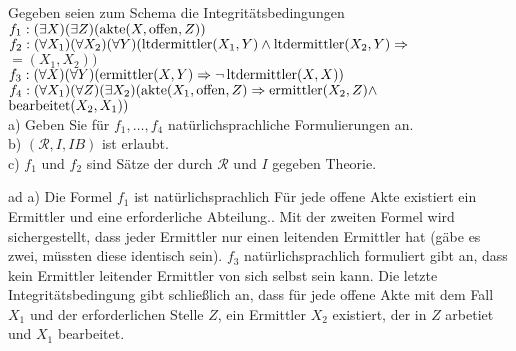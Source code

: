 \documentclass[12pt,a4paper]{amsart}
\begin{document}
\bigskip

\begin{aufgabe1}
Gegeben seien zum Schema die Integritätsbedingungen\\
$f_1:(\exists X)(\exists Z)(\operatorname{akte}(X,\operatorname{offen},Z))$\\
$f_2:(\forall X_1)(\forall X_2)(\forall Y)(\operatorname{ltdermittler}(X_1,Y)\land\operatorname{ltdermittler}(X_2,Y)\Rightarrow$\\ $=(X_1,X_2))$\\
$f_3:(\forall X)(\forall Y)(\operatorname{ermittler}(X,Y)\Rightarrow\lnot\operatorname{ltdermittler}(X,X))$\\
$f_4:(\forall X_1)(\forall Z)(\exists X_2)(\operatorname{akte}(X_1,\operatorname{offen},Z)\Rightarrow\operatorname{ermittler}(X_2,Z)\land$\\ $\operatorname{bearbeitet}(X_2,X_1))$\\
a) Geben Sie für $f_1,\dots,f_4$ natürlichsprachliche Formulierungen an.\\
b) $(\mathcal{R},I,IB)$ ist erlaubt.\\
c) $f_1$ und $f_2$ sind Sätze der durch $\mathcal{R}$ und $I$ gegeben Theorie.
\end{aufgabe1}

\medskip

ad a) Die Formel $f_1$ ist natürlichsprachlich \glqq Für jede offene Akte existiert ein Ermittler und eine erforderliche Abteilung.\grqq . Mit
der zweiten Formel wird sichergestellt, dass jeder Ermittler nur einen leitenden Ermittler hat (gäbe es zwei, müssten diese identisch sein). $f_3$
natürlichsprachlich formuliert gibt an, dass kein Ermittler leitender Ermittler von sich selbst sein kann. Die letzte Integritätsbedingung gibt
schließlich an, dass für jede offene Akte mit dem Fall $X_1$ und der erforderlichen Stelle $Z$, ein Ermittler $X_2$ existiert, der in $Z$ arbetiet und
$X_1$ bearbeitet.

\medskip
\end{document}
